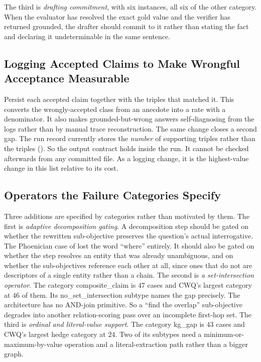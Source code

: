 The third is \emph{drafting commitment}, with six instances, all six of the
\textsf{other} category. When the evaluator has resolved the exact gold value
and the verifier has returned \textsf{grounded}, the drafter should commit to it
rather than stating the fact and declaring it undeterminable in the same
sentence.

\subsection{Logging Accepted Claims to Make Wrongful Acceptance
Measurable}\label{sec:future-logging}

Persist each accepted claim together with the triples that matched it. This
converts the wrongly-accepted class from an anecdote
into a rate with a denominator. It also makes grounded-but-wrong answers
self-diagnosing from the logs rather than by manual trace reconstruction. The
same change closes a second gap. The run record currently stores the
\emph{number} of supporting triples rather than the triples
(). So the output contract holds inside the run. It
cannot be checked afterwards from any committed file. As a logging change, it is
the highest-value change in this list relative to its cost.

\subsection{Operators the Failure Categories Specify}

Three additions are specified by categories rather than motivated by them. The
first is \emph{adaptive decomposition gating}. A decomposition step should be
gated on whether the rewritten sub-objective preserves the question's actual
interrogative. The Phoenician case of  lost the
word ``where'' entirely. It should also be gated on whether the step resolves an
entity that was already unambiguous, and on whether the sub-objectives reference
each other at all, since ones that do not are descriptors of a single entity
rather than a chain. The second is \emph{a set-intersection operator}. The
category \textsf{composite\_claim} is $47$ cases and CWQ's largest category at
$46$ of them. Its \textsf{no\_set\_intersection} subtype names the gap
precisely. The architecture has no AND-join primitive. So a ``find the overlap''
sub-objective degrades into another relation-scoring pass over an incomplete
first-hop set. The third is \emph{ordinal and literal-value support}. The
category \textsf{kg\_gap} is $43$ cases and CWQ's largest hedge category at
$24$. Two of its subtypes need a minimum-or-maximum-by-value operation and a
literal-extraction path rather than a bigger graph.

